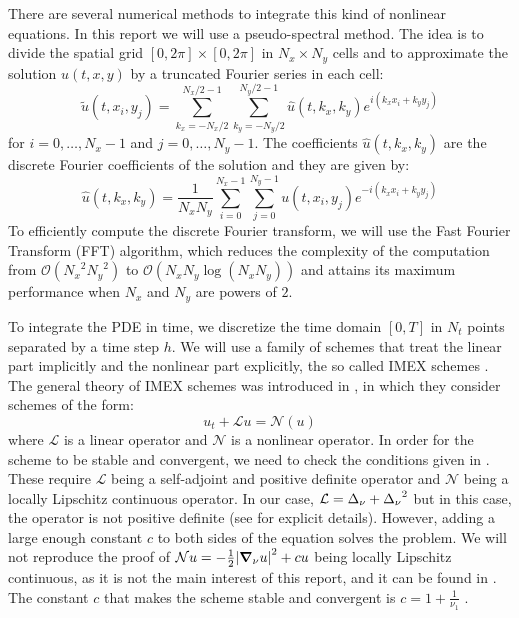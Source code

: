 \documentclass[twoside]{article}
\begin{document}
There are several numerical methods to integrate this kind of nonlinear equations. In this report we will use a pseudo-spectral method. The idea is to divide the spatial grid $[0,2\pi]\times [0,2\pi]$ in $N_x \times N_y$ cells and to approximate the solution $u(t,x,y)$ by a truncated Fourier series in each cell:
\begin{equation}\label{eq:idft}
  \tilde{u}(t,x_i,y_j) = \sum_{k_x=-N_x/2}^{N_x/2-1} \sum_{k_y=-N_y/2}^{N_y/2-1} \hat{u}(t,k_x,k_y) e^{i(k_x x_i + k_y y_j)}
\end{equation}
for $i=0,\dots,N_x-1$ and $j=0,\dots,N_y-1$. The coefficients $\hat{u}(t,k_x,k_y)$ are the discrete Fourier coefficients of the solution and they are given by:
\begin{equation}\label{eq:dft}
  \hat{u}(t,k_x,k_y) = \frac{1}{N_x N_y} \sum_{i=0}^{N_x-1} \sum_{j=0}^{N_y-1} u(t,x_i,y_j) e^{-i(k_x x_i + k_y y_j)}
\end{equation}
To efficiently compute the discrete Fourier transform, we will use the Fast Fourier Transform (FFT) algorithm, which reduces the complexity of the computation from $\mathcal{O}({N_x}^2 {N_y}^2)$ to $\mathcal{O}(N_x N_y \log(N_x N_y))$ and attains its maximum performance when $N_x$ and $N_y$ are powers of $2$.

To integrate the PDE in time, we discretize the time domain $[0,T]$ in $N_t$ points separated by a time step $h$. We will use a family of schemes that treat the linear part implicitly and the nonlinear part explicitly, the so called IMEX schemes \cite{Akrivis_kuramoto}. The general theory of IMEX schemes was introduced in \cite{Akrivis2004}, in which they consider schemes of the form:
\begin{equation}\label{eq:nonlinear_pde}
  u_t+\mathcal{L}u=\mathcal{N}(u)
\end{equation}
where $\mathcal{L}$ is a linear operator and $\mathcal{N}$ is a nonlinear operator. In order for the scheme to be stable and convergent, we need to check the conditions given in \cite{Akrivis2004}. These require $\mathcal{L}$ being a self-adjoint and positive definite operator and $\mathcal{N}$ being a locally Lipschitz continuous operator. In our case, $\mathcal{L}=\Delta_\nu + {\Delta_\nu}^2$ but in this case, the operator is not positive definite (see \cite{phdthesis_anna} for explicit details). However, adding a large enough constant $c$ to both sides of the equation solves the problem. We will not reproduce the proof of $\mathcal{N}u=-\frac{1}{2} \abs{\grad_\nu u}^2 + cu$ being locally Lipschitz continuous, as it is not the main interest of this report, and it can be found in \cite{Akrivis_kuramoto}. The constant $c$ that makes the scheme stable and convergent is $c=1+\frac{1}{\nu_1}$ \cite{phdthesis_anna}.
\end{document}

